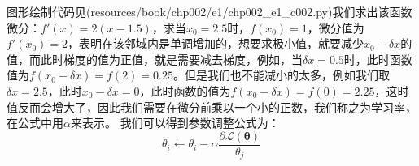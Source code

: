\documentclass[UTF8]{article}
\begin{document}
图形绘制代码见(resources/book/chp002/e1/chp002\_e1\_c002.py)我们求出该函数微分：$f'(x)=2(x-1.5)$，求当$x_{0}=2.5$时，$f(x_{0})=1$，微分值为$f'(x_{0})=2$，表明在该邻域内是单调增加的，想要求极小值，就要减少$x_{0}-\delta x$的值，而此时梯度的值为正值，就是需要减去梯度，例如，当$\delta x = 0.5$时，此时函数值为$f(x_{0} - \delta x)=f(2)=0.25$。但是我们也不能减小的太多，例如我们取$\delta x = 2.5$，此时$x_{0} - \delta x=0$，此时函数的值为$f(x_{0} - \delta x)=f(0)=2.25$，这时值反而会增大了，因此我们需要在微分前乘以一个小的正数，我们称之为学习率，在公式中用$\alpha$来表示。\newline
我们可以得到参数调整公式为：
\begin{equation}
\theta _{i} \leftarrow \theta _{i} - \alpha \frac{\partial{\mathcal{L}(\boldsymbol{\theta})}}{\theta _{j}}
\label{lrrn-parameter-update-formula}
\end{equation}
\end{document}
